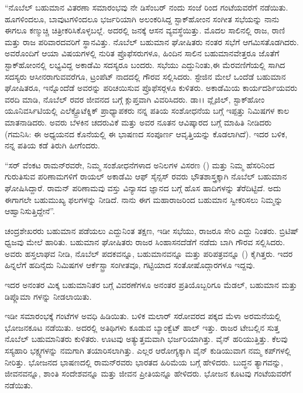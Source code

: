 \enginline{-}“ನೊಬೆಲ್ ಬಹುಮಾನ ವಿತರಣಾ ಸಮಾರಂಭವು ನೇ ಡಿಸೆಂಬರ್ ನಂದು ಸಂಜೆ  ರಿಂದ  ಗಂಟೆಯವರೆಗೆ ನಡೆಯಿತು. ಹೂಗಳಿಂದಲೂ, ಬಾವುಟಗಳಿಂದಲೂ ಭರ್ಜರಿಯಾಗಿ ಅಲಂಕರಿಸಿದ್ದ ಸ್ಟಾಕ್‍ಹೋಂನ ಸಂಗೀತ ಸಭೆಯನ್ನು ನಾನು ಈಗಲೂ ಕಣ್ಮುಚ್ಚಿ ಚಿತ್ರೀಕರಿಸಿಕೊಳ್ಳಬಲ್ಲೆ. ಅದರಲ್ಲಿ  ಜನಕ್ಕೆ ಆಸನ ವ್ಯವಸ್ಥೆಯಿತ್ತು. ಮೊದಲ ಸಾಲಿನಲ್ಲಿ ರಾಜ, ರಾಣಿ ಮತ್ತು ರಾಜ ಪರಿವಾರದವರಿಗೆ ಸ್ಥಾನವಿತ್ತು. ನೊಬೆಲ್ ಬಹುಮಾನ ಘೋಷಿತರು ನಂತರ ಸಭೆಗೆ ಆಗಮಿಸತೊಡಗಿದರು. ಅವರೊಂದಿಗೆ ಆಯಾ ವಿಷಯಗಳಲ್ಲಿ ನುರಿತ ಪ್ರೊಫೆಸರುಗಳೂ, ಹಿಂದಿನ ಸಾಲಿನ ಬಹುಮಾನವೇತ್ತರೂ ಜೊತೆಗೆ ಸ್ಟಾಕ್‍ಹೋಂನಲ್ಲಿ ಲಭ್ಯವಿದ್ದ ಅಕಾಡೆಮಿ ಸದಸ್ಯರೂ ಬಂದರು. ಸಭೆಯು ಎದ್ದುನಿಂತು,\break ಈ ಮೆರವಣಿಗೆಯಲ್ಲಿ ಸಾಗಿದ ಸದಸ್ಯರು ಆಸೀನರಾಗುವವರೆಗೂ, ಟ್ರಂಪೆಟ್ ನಾದದಲ್ಲಿ ಗೌರವ ಸಲ್ಲಿಸಿದರು. ಸ್ಟೇಜಿನ ಮೇಲೆ ಒಂದೆಡೆ ಬಹುಮಾನ ಘೋಷಿತರೂ, ಇನ್ನೊಂದೆಡೆ ಅವರನ್ನು ಪರಿಚಯಿಸುವ ಪ್ರೊಫೆಸರ್‍ಗಳೂ ಕುಳಿತರು. ಅಕಾಡೆಮಿಯ ಕಾರ್ಯದರ್ಶಿಯವರು ವರದಿ ಮಾಡಿ, ನೊಬೆಲ್ ರವರ ಜೀವನದ ಬಗ್ಗೆ ಕ್ಲುಪ್ತವಾಗಿ ವಿವರಿಸಿದರು. ಡಾ।। ವ್ಲೈಜಿಲ್, ಸ್ಟಾಕ್‍ಹೋಂ ಯೂನಿವರ್ಸಿಟಿಯಲ್ಲಿ ಎಲೆಕ್ಟ್ರೊಟೆಕ್ನಿಕ್ ಪ್ರಾಧ್ಯಾಪಕರು ನನ್ನ ಪತಿಯ ಸಂಶೋಧನೆಯ ಬಗ್ಗೆ ಇಪ್ಪತ್ತು ನಿಮಿಷಗಳ ಕಾಲ ಮಾತನಾಡಿದರು. ಅವರು ಬೆಳಕಿನ ಚದರುವಿಕೆ ಮತ್ತು ಅವರ ನೂತನ ಆವಿಷ್ಕಾರದ ಬಗ್ಗೆ ಮಾಹಿತಿ ನೀಡಿದರು (ಗಮನಿಸಿ: ಈ ಅಧ್ಯಯನದ ಕೊನೆಯಲ್ಲಿ ಈ ಭಾಷಣದ ಸಂಪೂರ್ಣ ಆವೃತ್ತಿಯನ್ನು ಕೊಡಲಾಗಿದೆ). ಇದರ ಬಳಿಕ, ನನ್ನ ಪತಿಯ ಕಡೆ ತಿರುಗಿ ಹೀಗೆಂದರು.

“ಸರ್ ವೆಂಕಟ ರಾಮನ್‍ರವರೇ, ನಿಮ್ಮ ಸಂಶೋಧನೆಗಳಾದ ಅನಿಲಗಳ ವಿಸರಣ () ಮತ್ತು ನಿಮ್ಮ ಹೆಸರಿನಿಂದ ಗುರುತಿಸುವ ಪರಿಣಾಮಗಳಿಗೆ ರಾಯಲ್ ಅಕಾಡೆಮಿ ಆಫ್ ಸೈನ್ಸಸ್ ರವರು ಭೌತಶಾಸ್ತ್ರಕ್ಕಾಗಿ ನೊಬೆಲ್ ಬಹುಮಾನ ಘೋಷಿಸಿದ್ದಾರೆ. ರಾಮನ್ ಪರಿಣಾಮವು ವಸ್ತು ವಿನ್ಯಾಸದ ಜ್ಞಾನದ ಬಗ್ಗೆ ಹೊಸ ಹಾದಿಗಳನ್ನು ತೆರೆದಿಟ್ಟಿದೆ. ಅದು ಈಗಾಗಲೇ ಬಹುಮುಖ್ಯ ಫಲಗಳನ್ನು ನೀಡಿದೆ. ನಾನು ಈಗ ಮಹಾರಾಜರಿಂದ ಬಹುಮಾನ ಸ್ವೀಕರಿಸಲು ನಿಮ್ಮನ್ನು ಆಹ್ವಾನಿಸುತ್ತಿದ್ದೇನೆ”.

\vskip 1pt

ಚಂದ್ರಶೇಖರರು ಬಹುಮಾನ ಪಡೆಯಲು ಎದ್ದುನಿಂತ ತಕ್ಷಣ, ಇಡೀ ಸಭೆಯು, ರಾಜರೂ ಸೇರಿ ಎದ್ದು ನಿಂತರು. ಬ್ರಿಟಿಷ್ ಧ್ವಜವು ಮೇಲೆ ಹಾರಿತು. ಬಹುಮಾನ ಘೋಷಿತರು ರಾಜರ ಸಿಂಹಾಸನದೆಡೆಗೆ ನಡೆದು ಬಾಗಿ ಗೌರವ ಸಲ್ಲಿಸಿದರು. ಅವರು ಹಸ್ತಲಾಘವ ನೀಡಿ, ನೊಬೆಲ್ ಪದಕವನ್ನೂ, ಬಹುಮಾನವನ್ನೂ ಮತ್ತು ಪರಿಪತ್ರವನ್ನೂ () ಕೈಗಿತ್ತರು. ಇದರ ಹಿನ್ನಲೆಗೆ ಹದಿನೈದು ನಿಮಿಷಗಳ ಆರ್ಕೆಸ್ಟ್ರಾ ಸಂಗೀತವೂ, ಗಟ್ಟಿಯಾದ ಸಂತೋಷೊದ್ಗಾರಗಳೂ ಇದ್ದವು.

\vskip 1pt

ಇದರ ಅನಂತರ ಮಿಕ್ಕ ಬಹುಮಾನಿತರ ಬಗ್ಗೆ ವಿವರಣೆಗಳೂ ಅನಂತರ ಪ್ರತಿಯೊಬ್ಬರಿಗೂ ಮೆಡಲ್, ಬಹುಮಾನ ಮತ್ತು ಡಿಪ್ಲೊಮಾ ಗಳನ್ನು ನೀಡಲಾಯಿತು.

\vskip 1pt

ಇಡೀ ಸಮಾರಂಭಕ್ಕೆ  ಗಂಟೆಗಳ ಅವಧಿ ಹಿಡಿಯಿತು. ಬಳಿಕ ಮಲಾರ್ ಸರೋವರದ ಪಕ್ಕದ ಮೆಳಾ ಅರಮನೆಯಲ್ಲಿ ಭೋಜನಕೂಟ ನಡೆಯಿತು. ಅದರಲ್ಲಿ  ಅತಿಥಿಗಳು ಕೂಡುವ ಬ್ಯಾಂಕ್ವೆಟ್ ಹಾಲ್ ಇತ್ತು. ರಾಜರ ಟೇಬಲ್ಲಿನ ಸುತ್ತ ನೊಬೆಲ್ ಬಹುಮಾನಿತರು ಕುಳಿತರು. ಊಟವು ಅತ್ಯುತ್ತಮವಾಗಿ ಭರ್ಜರಿಯಾಗಿತ್ತು. ವೈನ್ ಹರಿಯುತ್ತಿತ್ತು. ಕೆಲವು ಸಸ್ಯಹಾರಿ ಭಕ್ಷ್ಯಗಳನ್ನು ನಮಗಾಗಿ ತಯಾರಿಸಲಾಗಿತ್ತು. ಎಲ್ಲರ ಆರೋಗ್ಯಕ್ಕಾಗಿ ವೈನ್ ಕುಡಿಯುವಾಗ ನಮ್ಮ ಕಪ್‍ಗಳಲ್ಲಿ ನೀರಿತ್ತು. ಭೋಜನದ ಭಾಷಣದಲ್ಲಿ ರಾಮನ್‍ರವರು ಭಾರತದ ಹಿರಿಮೆಯ ಬಗ್ಗೆ ಹೇಳಿದರು. ಬುದ್ಧನ ತ್ಯಾಗವನ್ನು, ಜೀವನವನ್ನೂ, ಶಾಂತಿ ಸಂದೇಶವನ್ನೂ ಮತ್ತು ಜೀವನ ಪ್ರೀತಿಯನ್ನೂ ಹೇಳಿದರು. ಭೋಜನ ಕೂಟವು  ಗಂಟೆಯವರೆಗೆ ನಡೆಯಿತು.

